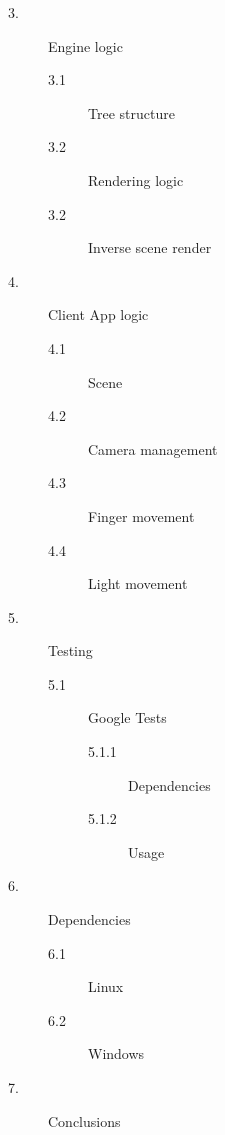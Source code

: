 \documentclass[a4paper]{article}
\begin{document}
\begin{description}
  \item [3.] Engine logic
  \begin{description}
    \item [3.1] Tree structure \dotfill 
    \item [3.2] Rendering logic \dotfill
    \item [3.2] Inverse scene render \dotfill
  \end{description}
\end{description}

\begin{description}
  \item [4.] Client App logic
  \begin{description}
    \item [4.1] Scene \dotfill 
    \item [4.2] Camera management \dotfill 
    \item [4.3] Finger movement \dotfill 
    \item [4.4] Light movement \dotfill 
  \end{description}
\end{description}

\begin{description}
  \item [5.] Testing
  \begin{description}
    \item [5.1] Google Tests \dotfill 
    \begin{description}
      \item [5.1.1] Dependencies \dotfill 
      \item [5.1.2] Usage \dotfill 
    \end{description}
  \end{description}
\end{description}

\begin{description}
  \item [6.] Dependencies
  \begin{description}
    \item [6.1] Linux \dotfill 
    \item [6.2] Windows \dotfill 
  \end{description}
\end{description}

\begin{description}
  \item [7.] Conclusions
\end{description}
\end{document}
